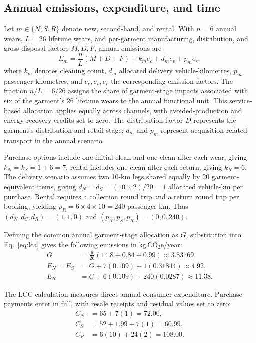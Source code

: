 \documentclass[11pt,a4paper]{article}
\newcommand{\co}{\ensuremath{\mathrm{kg\,CO_2e}}}
\begin{document}
\subsection{Annual emissions, expenditure, and time}
Let $m\in\{N,S,R\}$ denote new, second-hand, and rental. With $n=6$ annual wears, $L=26$ lifetime wears, and per-garment manufacturing, distribution, and gross disposal factors $M,D,F$, annual emissions are
\begin{equation}
E_m=\frac{n}{L}(M+D+F)+k_m e_c+d_m e_v+p_m e_r,
\label{eq:lca}
\end{equation}
where $k_m$ denotes cleaning count, $d_m$ allocated delivery vehicle-kilometres, $p_m$ passenger-kilometres, and $e_c,e_v,e_r$ the corresponding emission factors. The fraction $n/L=6/26$ assigns the share of garment-stage impacts associated with six of the garment's 26 lifetime wears to the annual functional unit. This service-based allocation applies equally across channels, with avoided-production and energy-recovery credits set to zero. The distribution factor $D$ represents the garment's distribution and retail stage; $d_m$ and $p_m$ represent acquisition-related transport in the annual scenario.

Purchase options include one initial clean and one clean after each wear, giving $k_N=k_S=1+6=7$; rental includes one clean after each return, giving $k_R=6$. The delivery scenario assumes two 10-km legs shared equally by 20 garment-equivalent items, giving $d_N=d_S=(10\times2)/20=1$ allocated vehicle-km per purchase. Rental requires a collection round trip and a return round trip per booking, yielding $p_R=6\times4\times10=240$ passenger-km. Thus $(d_N,d_S,d_R)=(1,1,0)$ and $(p_N,p_S,p_R)=(0,0,240)$.

Defining the common annual garment-stage allocation as $G$, substitution into Eq.~\ref{eq:lca} gives the following emissions in \co/year:
\begin{equation}
\begin{aligned}
G&=\frac{6}{26}(14.8+0.84+0.99)\approx3.83769,\\
E_N=E_S&=G+7(0.109)+1(0.31844)\approx4.92,\\
E_R&=G+6(0.109)+240(0.0287)\approx11.38.
\end{aligned}
\label{eq:lca_values}
\end{equation}

The LCC calculation measures direct annual consumer expenditure. Purchase payments enter in full, with resale receipts and residual values set to zero:
\begin{equation}
\begin{aligned}
C_N&=65+7(1)=72.00,\\
C_S&=52+1.99+7(1)=60.99,\\
C_R&=6(10)+24(2)=108.00.
\end{aligned}
\label{eq:cost}
\end{equation}
\end{document}

